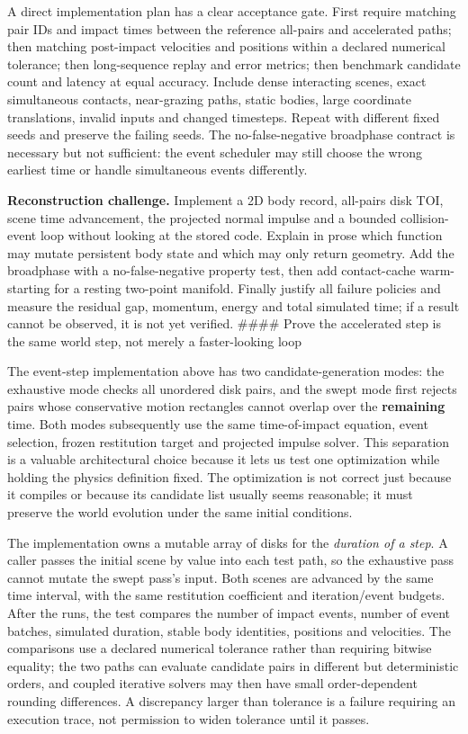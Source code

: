 A direct implementation plan has a clear acceptance gate. First require matching pair IDs and impact times between the reference all-pairs and accelerated paths; then matching post-impact velocities and positions within a declared numerical tolerance; then long-sequence replay and error metrics; then benchmark candidate count and latency at equal accuracy. Include dense interacting scenes, exact simultaneous contacts, near-grazing paths, static bodies, large coordinate translations, invalid inputs and changed timesteps. Repeat with different fixed seeds and preserve the failing seeds. The no-false-negative broadphase contract is necessary but not sufficient: the event scheduler may still choose the wrong earliest time or handle simultaneous events differently.

\textbf{Reconstruction challenge.} Implement a 2D body record, all-pairs disk TOI, scene time advancement, the projected normal impulse and a bounded collision-event loop without looking at the stored code. Explain in prose which function may mutate persistent body state and which may only return geometry. Add the broadphase with a no-false-negative property test, then add contact-cache warm-starting for a resting two-point manifold. Finally justify all failure policies and measure the residual gap, momentum, energy and total simulated time; if a result cannot be observed, it is not yet verified. \#\#\#\# Prove the accelerated step is the same world step, not merely a faster-looking loop

The event-step implementation above has two candidate-generation modes: the exhaustive mode checks all unordered disk pairs, and the swept mode first rejects pairs whose conservative motion rectangles cannot overlap over the \textbf{remaining} time. Both modes subsequently use the same time-of-impact equation, event selection, frozen restitution target and projected impulse solver. This separation is a valuable architectural choice because it lets us test one optimization while holding the physics definition fixed. The optimization is not correct just because it compiles or because its candidate list usually seems reasonable; it must preserve the world evolution under the same initial conditions.

The implementation owns a mutable array of disks for the \emph{duration of a step}. A caller passes the initial scene by value into each test path, so the exhaustive pass cannot mutate the swept pass's input. Both scenes are advanced by the same time interval, with the same restitution coefficient and iteration/event budgets. After the runs, the test compares the number of impact events, number of event batches, simulated duration, stable body identities, positions and velocities. The comparisons use a declared numerical tolerance rather than requiring bitwise equality; the two paths can evaluate candidate pairs in different but deterministic orders, and coupled iterative solvers may then have small order-dependent rounding differences. A discrepancy larger than tolerance is a failure requiring an execution trace, not permission to widen tolerance until it passes.

